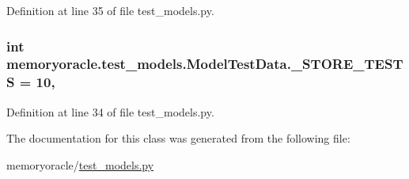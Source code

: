 Definition at line 35 of file test\+\_\+models.\+py.

\hypertarget{classmemoryoracle_1_1test__models_1_1ModelTestData_a5850fe11a76c5bfdb098c7f17a27185d}{}
\subsubsection[{\+\_\+\+S\+T\+O\+R\+E\+\_\+\+T\+E\+S\+T\+S}]{\setlength{\rightskip}{0pt plus 5cm}int memoryoracle.\+test\+\_\+models.\+Model\+Test\+Data.\+\_\+\+S\+T\+O\+R\+E\+\_\+\+T\+E\+S\+T\+S = 10\hspace{0.3cm}{\ttfamily [static]}, {\ttfamily [private]}}\label{classmemoryoracle_1_1test__models_1_1ModelTestData_a5850fe11a76c5bfdb098c7f17a27185d}


Definition at line 34 of file test\+\_\+models.\+py.



The documentation for this class was generated from the following file\+:\begin{DoxyCompactItemize}
\item 
memoryoracle/\hyperlink{test__models_8py}{test\+\_\+models.\+py}\end{DoxyCompactItemize}
